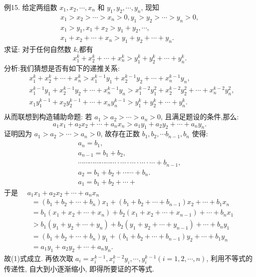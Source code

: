 例15. 给定两组数 $x_1, x_2, \cdots, x_n$ 和 $y_1, y_2, \cdots, y_n$, 现知
$$
\begin{gathered}
x_1>x_2>\cdots>x_n>0, y_1>y_2>\cdots>y_n>0, \\
x_1>y_1, x_1+x_2>y_1+y_2, \cdots, \\
x_1+x_2+\cdots+x_n>y_1+y_2+\cdots+y_n .
\end{gathered}
$$
求证: 对于任何自然数 $k$,都有
$$
x_1^k+x_2^k+\cdots+x_n^k>y_1^k+y_2^k+\cdots+y_n^k .
$$
分析:我们猜想是否有如下的递推关系:
$$
\begin{aligned}
& x_1^k+x_2^k+\cdots+x_n^k>x_1^{k-1} y_1+x_2^{k-1} y_2+\cdots+x_n^{k-1} y_n, \\
& x_1^{k-1} y_1+x_2^{k-1} y_2+\cdots+x_n^{k-1} y_n>x_1^{k-2} y_1^2+x_2^{k-2} y_2^2+\cdots+x_n^{k-2} y_n^2 \text {, } \\
& x_1 y_1^{k-1}+x_2 y_2^{k-1}+\cdots+x_n y_n^{k-1}>y_1^k+y_2^k+\cdots+y_n^k . \\
&
\end{aligned}
$$
从而联想到构造辅助命题:
若 $a_1>a_2>\cdots>a_n>0$, 且满足题设的条件,那么:
$$
a_1 x_1+a_2 x_2+\cdots+a_n x_n>a_1 y_1+a_2 y_2+\cdots+a_n y_n . \label{(1)}
$$
证明因为 $a_1>a_2>\cdots>a_n>0$, 故存在正数 $b_1, b_2, \cdots b_{n-1}, b_n$ 使得:
$$
\begin{gathered}
a_n=b_1, \\
a_{n-1}=b_1+b_2, \\
\cdots \cdots \cdots \cdots \cdots \cdots \cdots \cdot \cdots \cdot \cdots \cdot \cdots \cdot \cdots+b_{n-1}, \\
a_2=b_1+b_2+\cdots \cdots+b_n . \\
a_1=b_1+b_2+\cdots+
\end{gathered}
$$
于是 $\quad a_1 x_1+a_2 x_2+\cdots+a_n x_n$
$$
\begin{aligned}
& =\left(b_1+b_2+\cdots+b_n\right) x_1+\left(b_1+b_2+\cdots+b_{n-1}\right) x_2+\cdots+b_1 x_n \\
& =b_1\left(x_1+x_2+\cdots+x_n\right)+b_2\left(x_1+x_2+\cdots+x_{n-1}\right)+\cdots+b_n x_1 \\
& >b_1\left(y_1+y_2+\cdots+y_n\right)+b_2\left(y_1+y_2+\cdots+y_{n-1}\right)+\cdots+b_n y_1 \\
& =\left(b_1+b_2+\cdots+b_n\right) y_1+\left(b_1+b_2+\cdots+b_{n-1}\right) y_2+\cdots+b_1 y_n \\
& =a_1 y_1+a_2 y_2+\cdots+a_n y_n .
\end{aligned}
$$
故(1)式成立.
再依次取 $a_i=x_i^{k-1}, x_i^{k-2} y_i, \cdots, y_i^{k-1}(i=1,2, \cdots, n)$, 利用不等式的传递性, 自大到小逐渐缩小, 即得所要证的不等式.



